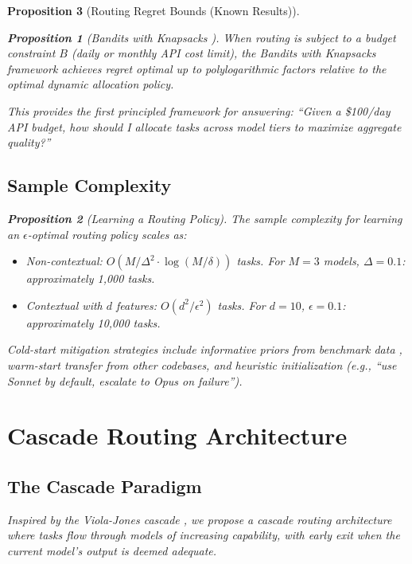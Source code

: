 \documentclass[11pt, a4paper, logo, copyright]{googledeepmind}
\newtheorem{proposition}{Proposition}[section]
\begin{document}
\begin{proposition}[Routing Regret Bounds (Known Results)]
\begin{proposition}[Bandits with Knapsacks {\citep{badanidiyuru2018bwk}}]
\label{prop:bwk}
When routing is subject to a budget constraint $B$ (daily or monthly API cost limit), the Bandits with Knapsacks framework achieves regret optimal up to polylogarithmic factors relative to the optimal dynamic allocation policy.
\end{proposition}

This provides the first principled framework for answering: ``Given a \$100/day API budget, how should I allocate tasks across model tiers to maximize aggregate quality?''

\subsection{Sample Complexity}

\begin{proposition}[Learning a Routing Policy]
\label{prop:samplecomplexity}
The sample complexity for learning an $\epsilon$-optimal routing policy scales as:
\begin{itemize}
\item Non-contextual: $O(M / \Delta^2 \cdot \log(M / \delta))$ tasks. For $M = 3$ models, $\Delta = 0.1$: approximately 1,000 tasks.
\item Contextual with $d$ features: $O(d^2 / \epsilon^2)$ tasks. For $d = 10$, $\epsilon = 0.1$: approximately 10,000 tasks.
\end{itemize}
\end{proposition}

Cold-start mitigation strategies include informative priors from benchmark data \citep{agrawal2012thompson}, warm-start transfer from other codebases, and heuristic initialization (e.g., ``use Sonnet by default, escalate to Opus on failure'').


\section{Cascade Routing Architecture}
\label{sec:cascade}

\subsection{The Cascade Paradigm}

Inspired by the Viola-Jones cascade \citep{violajones2001, violajones2004}, we propose a cascade routing architecture where tasks flow through models of increasing capability, with early exit when the current model's output is deemed adequate.


\end{proposition}
\end{document}
